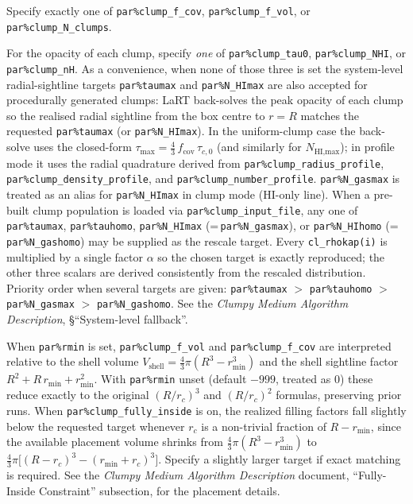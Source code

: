 \documentclass[english,a4paper]{my_memo}
\newcommand{\parm}[1]{\texttt{par\%#1}}
\begin{document}
Specify exactly one of \parm{clump\_f\_cov}, \parm{clump\_f\_vol}, or \parm{clump\_N\_clumps}.

\begin{sloppypar}
For the opacity of each clump, specify \emph{one} of \parm{clump\_tau0}, \parm{clump\_NHI}, or \parm{clump\_nH}.  As a convenience, when none of those three is set the system-level radial-sightline targets \parm{taumax} and \parm{N\_HImax} are also accepted for procedurally generated clumps: LaRT back-solves the peak opacity of each clump so the realised radial sightline from the box centre to $r=R$ matches the requested \parm{taumax} (or \parm{N\_HImax}).  In the uniform-clump case the back-solve uses the closed-form $\tau_\text{max} = \tfrac{4}{3}\,f_\text{cov}\,\tau_{c,0}$ (and similarly for $N_\text{HI,max}$); in profile mode it uses the radial quadrature derived from \parm{clump\_radius\_profile}, \parm{clump\_density\_profile}, and \parm{clump\_number\_profile}. \parm{N\_gasmax} is treated as an alias for \parm{N\_HImax} in clump mode (HI-only line). When a pre-built clump population is loaded via \parm{clump\_input\_file}, any one of \parm{taumax}, \parm{tauhomo}, \parm{N\_HImax} (=\,\parm{N\_gasmax}), or \parm{N\_HIhomo} (=\,\parm{N\_gashomo}) may be supplied as the rescale target.  Every \texttt{cl\_rhokap(i)} is multiplied by a single factor $\alpha$ so the chosen target is exactly reproduced; the other three scalars are derived consistently from the rescaled distribution.  Priority order when several targets are given: \parm{taumax} $>$ \parm{tauhomo} $>$ \parm{N\_gasmax} $>$ \parm{N\_gashomo}.  See the \emph{Clumpy Medium Algorithm Description}, \S``System-level fallback''.
\end{sloppypar}

\begin{sloppypar}
When \parm{rmin} is set, \parm{clump\_f\_vol} and \parm{clump\_f\_cov} are interpreted relative to the shell volume $V_\text{shell} = \tfrac{4}{3}\pi (R^3 - r_\text{min}^3)$ and the shell sightline factor $R^2 + R\, r_\text{min} + r_\text{min}^2$.  With \parm{rmin} unset (default $-999$, treated as $0$) these reduce exactly to the original $(R/r_c)^3$ and $(R/r_c)^2$ formulas, preserving prior runs.  When \parm{clump\_fully\_inside} is on, the realized filling factors fall slightly below the requested target whenever $r_c$ is a non-trivial fraction of $R - r_\text{min}$, since the available placement volume shrinks from $\tfrac{4}{3}\pi (R^3 - r_\text{min}^3)$ to $\tfrac{4}{3}\pi \bigl[(R-r_c)^3 - (r_\text{min}+r_c)^3\bigr]$.  Specify a slightly larger target if exact matching is required.  See the \emph{Clumpy Medium Algorithm Description} document, ``Fully-Inside Constraint'' subsection, for the placement details.
\end{sloppypar}
\end{document}
